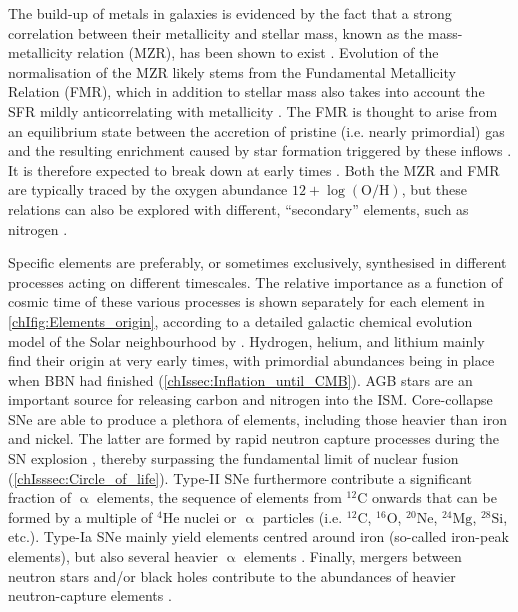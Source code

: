 The build-up of metals in galaxies is evidenced by the fact that a strong correlation between their metallicity and stellar mass, known as the mass-metallicity relation (MZR), has been shown to exist \citep[at least at late times, $z \lesssim 3$;][]{2008A&A...488..463M}. Evolution of the normalisation of the MZR likely stems from the Fundamental Metallicity Relation (FMR), which in addition to stellar mass also takes into account the SFR mildly anticorrelating with metallicity \citep{2010MNRAS.408.2115M}. The FMR is thought to arise from an equilibrium state between the accretion of pristine (i.e. nearly primordial) gas and the resulting enrichment caused by star formation triggered by these inflows \citep{2020MNRAS.491..944C}. It is therefore expected to break down at early times \citep[e.g.][]{2022arXiv220712375C}. Both the MZR and FMR are typically traced by the oxygen abundance $12 + \log \left( \mathrm{O/H} \right)$, but these relations can also be explored with different, ``secondary'' elements, such as nitrogen \citep[whose production rate is dependent on the metallicity itself; e.g.][]{2022MNRAS.512.2867H}.

Specific elements are preferably, or sometimes exclusively, synthesised in different processes acting on different timescales. The relative importance as a function of cosmic time of these various processes is shown separately for each element in \cref{chIfig:Elements_origin}, according to a detailed galactic chemical evolution model of the Solar neighbourhood by \citet{2020ApJ...900..179K}. Hydrogen, helium, and lithium mainly find their origin at very early times, with primordial abundances being in place when BBN had finished (\cref{chIssec:Inflation_until_CMB}). AGB stars are an important source for releasing carbon and nitrogen into the ISM. Core-collapse SNe are able to produce a plethora of elements, including those heavier than iron and nickel. The latter are formed by rapid neutron capture processes during the SN explosion \citep{2010gfe..book.....M}, thereby surpassing the fundamental limit of nuclear fusion (\cref{chIsssec:Circle_of_life}). Type-II SNe furthermore contribute a significant fraction of $\upalpha$ elements, the sequence of elements from $^{12}\text{C}$ onwards that can be formed by a multiple of $^{4}\text{He}$ nuclei or $\upalpha$ particles (i.e. $^{12}\text{C}$, $^{16}\text{O}$, $^{20}\text{Ne}$, $^{24}\text{Mg}$, $^{28}\text{Si}$, etc.). Type-Ia SNe mainly yield elements centred around iron (so-called iron-peak elements), but also several heavier $\upalpha$ elements . Finally, mergers between neutron stars and/or black holes contribute to the abundances of heavier neutron-capture elements \citep{2017Natur.551...75S}.

